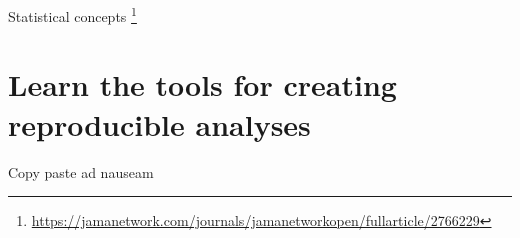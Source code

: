 \documentclass{beamer}\usepackage[]{graphicx}\usepackage[]{color}
\begin{document}
\begin{frame}{Statistical concepts}
	\footnote{\footnotesize \url{https://jamanetwork.com/journals/jamanetworkopen/fullarticle/2766229}}
\end{frame}



\section{Learn the tools for creating reproducible analyses}


\begin{frame}{Copy paste ad nauseam}
\end{frame}
\end{document}
